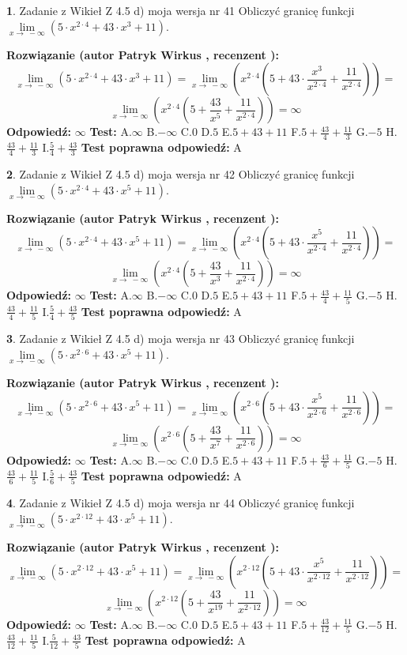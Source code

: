 \documentclass[12pt, a4paper]{article}
\theoremstyle{definition} %
\newtheorem{zad}{}
\newcommand{\zadStart}[1]{\begin{zad}#1\newline}
\newcommand{\zadStop}{\end{zad}}
\newcommand{\rozwStart}[2]{\noindent \textbf{Rozwiązanie (autor #1 , recenzent #2): }\newline}
\newcommand{\rozwStop}{\newline}
\newcommand{\odpStart}{\noindent \textbf{Odpowiedź:}\newline}
\newcommand{\odpStop}{\newline}
\newcommand{\testStart}{\noindent \textbf{Test:}\newline}
\newcommand{\testStop}{\newline}
\newcommand{\kluczStart}{\noindent \textbf{Test poprawna odpowiedź:}\newline}
\newcommand{\kluczStop}{\newline}
\begin{document}
\zadStart{Zadanie z Wikieł Z 4.5 d) moja wersja nr 41}
Obliczyć granicę funkcji  $\lim\limits_{x\to\ -\infty}(5 \cdot x^{2\cdot4}+43 \cdot x^{3}+11)$.
\zadStop
\rozwStart{Patryk Wirkus}{}
$$\lim\limits_{x\to\ -\infty}(5 \cdot x^{2\cdot4}+43 \cdot x^{3}+11) = \lim\limits_{x\to\ -\infty}(x^{2\cdot4}(5 +43 \cdot \frac{x^{3}}{x^{2\cdot4}}+\frac{11}{x^{2\cdot4}})) =$$ $$\lim\limits_{x\to\ -\infty}(x^{2\cdot4}(5 +\frac{43}{x^{5}}+\frac{11}{x^{2\cdot4}})) =\infty$$
\rozwStop
\odpStart
$\infty$
\odpStop
\testStart
A.$\infty$ B.$-\infty$ C.$0$ D.$5$ E.$5 + 43 + 11$
F.$5+\frac{43}{4}+\frac{11}{3}$ G.$-5$
H.$\frac{43}{4}+\frac{11}{3}$
I.$\frac{5}{4}+\frac{43}{3}$
\testStop
\kluczStart
A
\kluczStop



\zadStart{Zadanie z Wikieł Z 4.5 d) moja wersja nr 42}
Obliczyć granicę funkcji  $\lim\limits_{x\to\ -\infty}(5 \cdot x^{2\cdot4}+43 \cdot x^{5}+11)$.
\zadStop
\rozwStart{Patryk Wirkus}{}
$$\lim\limits_{x\to\ -\infty}(5 \cdot x^{2\cdot4}+43 \cdot x^{5}+11) = \lim\limits_{x\to\ -\infty}(x^{2\cdot4}(5 +43 \cdot \frac{x^{5}}{x^{2\cdot4}}+\frac{11}{x^{2\cdot4}})) =$$ $$\lim\limits_{x\to\ -\infty}(x^{2\cdot4}(5 +\frac{43}{x^{3}}+\frac{11}{x^{2\cdot4}})) =\infty$$
\rozwStop
\odpStart
$\infty$
\odpStop
\testStart
A.$\infty$ B.$-\infty$ C.$0$ D.$5$ E.$5 + 43 + 11$
F.$5+\frac{43}{4}+\frac{11}{5}$ G.$-5$
H.$\frac{43}{4}+\frac{11}{5}$
I.$\frac{5}{4}+\frac{43}{5}$
\testStop
\kluczStart
A
\kluczStop



\zadStart{Zadanie z Wikieł Z 4.5 d) moja wersja nr 43}
Obliczyć granicę funkcji  $\lim\limits_{x\to\ -\infty}(5 \cdot x^{2\cdot6}+43 \cdot x^{5}+11)$.
\zadStop
\rozwStart{Patryk Wirkus}{}
$$\lim\limits_{x\to\ -\infty}(5 \cdot x^{2\cdot6}+43 \cdot x^{5}+11) = \lim\limits_{x\to\ -\infty}(x^{2\cdot6}(5 +43 \cdot \frac{x^{5}}{x^{2\cdot6}}+\frac{11}{x^{2\cdot6}})) =$$ $$\lim\limits_{x\to\ -\infty}(x^{2\cdot6}(5 +\frac{43}{x^{7}}+\frac{11}{x^{2\cdot6}})) =\infty$$
\rozwStop
\odpStart
$\infty$
\odpStop
\testStart
A.$\infty$ B.$-\infty$ C.$0$ D.$5$ E.$5 + 43 + 11$
F.$5+\frac{43}{6}+\frac{11}{5}$ G.$-5$
H.$\frac{43}{6}+\frac{11}{5}$
I.$\frac{5}{6}+\frac{43}{5}$
\testStop
\kluczStart
A
\kluczStop



\zadStart{Zadanie z Wikieł Z 4.5 d) moja wersja nr 44}
Obliczyć granicę funkcji  $\lim\limits_{x\to\ -\infty}(5 \cdot x^{2\cdot12}+43 \cdot x^{5}+11)$.
\zadStop
\rozwStart{Patryk Wirkus}{}
$$\lim\limits_{x\to\ -\infty}(5 \cdot x^{2\cdot12}+43 \cdot x^{5}+11) = \lim\limits_{x\to\ -\infty}(x^{2\cdot12}(5 +43 \cdot \frac{x^{5}}{x^{2\cdot12}}+\frac{11}{x^{2\cdot12}})) =$$ $$\lim\limits_{x\to\ -\infty}(x^{2\cdot12}(5 +\frac{43}{x^{19}}+\frac{11}{x^{2\cdot12}})) =\infty$$
\rozwStop
\odpStart
$\infty$
\odpStop
\testStart
A.$\infty$ B.$-\infty$ C.$0$ D.$5$ E.$5 + 43 + 11$
F.$5+\frac{43}{12}+\frac{11}{5}$ G.$-5$
H.$\frac{43}{12}+\frac{11}{5}$
I.$\frac{5}{12}+\frac{43}{5}$
\testStop
\kluczStart
A
\kluczStop
\end{document}
